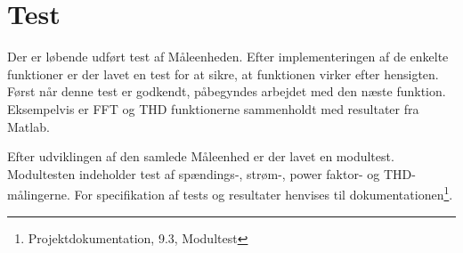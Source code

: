 
\section{Test}

Der er løbende udført test af Måleenheden. Efter implementeringen af de enkelte funktioner er der lavet en test for at sikre, at funktionen virker efter hensigten. Først når denne test er godkendt, påbegyndes arbejdet med den næste funktion. Eksempelvis er FFT og THD funktionerne sammenholdt med resultater fra Matlab. 

Efter udviklingen af den samlede Måleenhed er der lavet en modultest. Modultesten indeholder test af spændings-, strøm-, power faktor- og THD-målingerne. For specifikation af tests og resultater henvises til dokumentationen\footnote{Projektdokumentation, 9.3, Modultest}.

